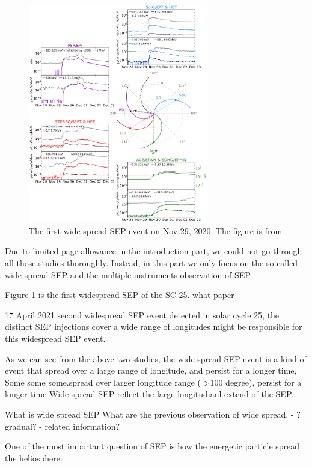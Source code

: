 \begin{figure}
	\centering
	\includegraphics[width = 0.7\textwidth]{images/2020-11-29_overview_plot.png}
	\caption{The first wide-spread \acl{SEP} event on Nov 29, 2020. The figure is from \citep{Kollhoff-2021}}
	\label{Fig:SEP_widespread}
\end{figure}

Due to limited page allowance in the introduction part, we could not go through all those studies thoroughly. Instead, in this part we only focus on the so-called wide-spread SEP and the multiple instruments observation of SEP.

Figure \ref{Fig:SEP_widespread} is the first widespread SEP of the SC 25. what paper


17 April 2021 second widespread SEP event detected in solar cycle 25,
 the distinct SEP injections cover a wide range of longitudes might be responsible for this widespread SEP event.

As we can see from the above two studies, the wide spread \ac{SEP} event is a kind of event that spread over a large range of longitude, and persist for a longer time, Some some some.spread over larger longitude range ( >100 degree), persist for a longer time
Wide spread SEP reflect the large longitudianl extend of the SEP.

What is wide spread SEP
What are the previous observation of wide spread, - ? gradual? - related information?


One of the most important question of SEP is how the energetic particle spread the heliosphere. 

